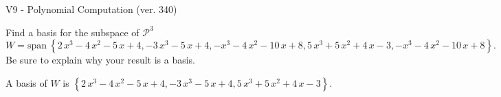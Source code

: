 \begin{exercise}
  \begin{exerciseTitle}V9 - Polynomial Computation (ver. 340)\end{exerciseTitle}
  \begin{exerciseStatement}
    Find a basis for the subspace of \(\mathcal{P}^3\) 
\[W=\mathrm{span}\ \left\{2 \, x^{3} - 4 \, x^{2} - 5 \, x + 4 , -3 \, x^{3} - 5 \, x + 4 , -x^{3} - 4 \, x^{2} - 10 \, x + 8 , 5 \, x^{3} + 5 \, x^{2} + 4 \, x - 3 , -x^{3} - 4 \, x^{2} - 10 \, x + 8\right\}.\]
 Be sure to explain why your result is a basis.


  \end{exerciseStatement}
  \begin{exerciseAnswer}
   A basis of \(W\) is  \(\left\{2 \, x^{3} - 4 \, x^{2} - 5 \, x + 4 , -3 \, x^{3} - 5 \, x + 4 , 5 \, x^{3} + 5 \, x^{2} + 4 \, x - 3\right\}\).
  


  \end{exerciseAnswer}
\end{exercise}